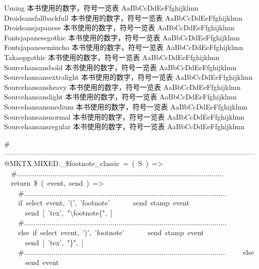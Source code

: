 Uming {\cjk\mktsFontfileUming{}本书使用的数字，符号一览表 AaBbCcDdEeFfghijklmn}\\
Droidsansfallbackfull {\cjk\mktsFontfileDroidsansfallbackfull{}本书使用的数字，符号一览表 AaBbCcDdEeFfghijklmn}\\
Droidsansjapanese {\cjk\mktsFontfileDroidsansjapanese{}本书使用的数字，符号一览表 AaBbCcDdEeFfghijklmn}\\
Fontsjapanesegothic {\cjk\mktsFontfileFontsjapanesegothic{}本书使用的数字，符号一览表 AaBbCcDdEeFfghijklmn}\\
Fontsjapanesemincho {\cjk\mktsFontfileFontsjapanesemincho{}本书使用的数字，符号一览表 AaBbCcDdEeFfghijklmn}\\
Takaopgothic {\cjk\mktsFontfileTakaopgothic{}本书使用的数字，符号一览表 AaBbCcDdEeFfghijklmn}\\
Sourcehansansbold {\cjk\mktsFontfileSourcehansansbold{}本书使用的数字，符号一览表 AaBbCcDdEeFfghijklmn}\\
Sourcehansansextralight {\cjk\mktsFontfileSourcehansansextralight{}本书使用的数字，符号一览表 AaBbCcDdEeFfghijklmn}\\
Sourcehansansheavy {\cjk\mktsFontfileSourcehansansheavy{}本书使用的数字，符号一览表 AaBbCcDdEeFfghijklmn}\\
Sourcehansanslight {\cjk\mktsFontfileSourcehansanslight{}本书使用的数字，符号一览表 AaBbCcDdEeFfghijklmn}\\
Sourcehansansmedium {\cjk\mktsFontfileSourcehansansmedium{}本书使用的数字，符号一览表 AaBbCcDdEeFfghijklmn}\\
Sourcehansansnormal {\cjk\mktsFontfileSourcehansansnormal{}本书使用的数字，符号一览表 AaBbCcDdEeFfghijklmn}\\
Sourcehansansregular {\cjk\mktsFontfileSourcehansansregular{}本书使用的数字，符号一览表 AaBbCcDdEeFfghijklmn}\\



\begingroup\mktsObeyAllLines{}

\begingroup\mktsStyleCode{}\#-----------------------------------------------------------------------------------------------------------
@MKTX.MIXED.\_\$footnote\_classic = ( S ) =>
  \#.........................................................................................................
  return \$ ( event, send ) =>
    \#.......................................................................................................
    if select event, '(', 'footnote'
      send stamp event
      send [ 'tex', "\textbackslash{}footnote\{", ]
    \#.......................................................................................................
    else if select event, ')', 'footnote'
      send stamp event
      send [ 'tex', "\}", ]
    \#.......................................................................................................
    else
      send event
\endgroup{}{}

\endgroup{}
